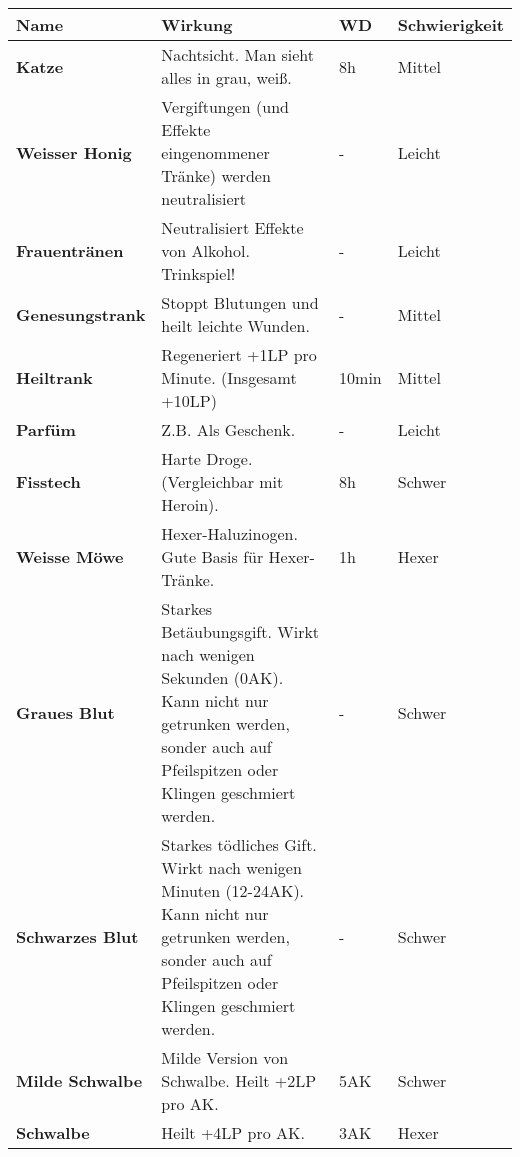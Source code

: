 \begin{tabular}{|p{3.5cm}|p{7cm}|p{1.5cm}|p{3cm}|}
\hline
\textbf{Name} & \textbf{Wirkung} & \textbf{WD} & \textbf{Schwierigkeit} \\

\hline
\textbf{Katze} & Nachtsicht. Man sieht alles in grau, weiß. & 8h & Mittel \\

\hline
\textbf{Weisser Honig} & Vergiftungen (und Effekte eingenommener Tränke) werden neutralisiert & - & Leicht \\

\hline
\textbf{Frauentränen} & Neutralisiert Effekte von Alkohol. Trinkspiel! & - & Leicht \\

\hline
\textbf{Genesungstrank} & Stoppt Blutungen und heilt leichte Wunden. & - & Mittel \\

\hline
\textbf{Heiltrank} & Regeneriert +1LP pro Minute. (Insgesamt +10LP) & 10min & Mittel \\

\hline
\textbf{Parfüm} & Z.B. Als Geschenk. & - & Leicht \\

\hline
\textbf{Fisstech} & Harte Droge. (Vergleichbar mit Heroin).  & 8h & Schwer \\

\hline
\textbf{Weisse Möwe} & Hexer-Haluzinogen. Gute Basis für Hexer-Tränke. & 1h & Hexer \\

\hline
\textbf{Graues Blut} & Starkes Betäubungsgift. Wirkt nach wenigen Sekunden (0AK). Kann nicht nur getrunken werden, sonder auch auf Pfeilspitzen oder Klingen geschmiert werden. & - & Schwer \\

\hline
\textbf{Schwarzes Blut} & Starkes tödliches Gift. Wirkt nach wenigen Minuten (12-24AK). Kann nicht nur getrunken werden, sonder auch auf Pfeilspitzen oder Klingen geschmiert werden. & - & Schwer \\

\hline
\textbf{Milde Schwalbe} & Milde Version von Schwalbe. Heilt +2LP pro AK. & 5AK & Schwer \\

\hline
\textbf{Schwalbe} & Heilt +4LP pro AK. & 3AK & Hexer \\

\hline
\end{tabular}


